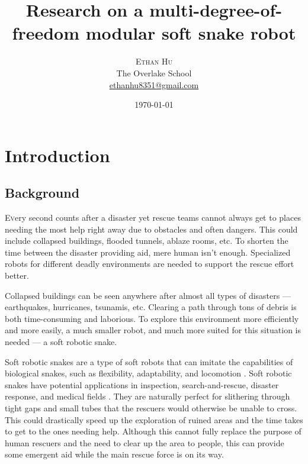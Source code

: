 \documentclass[twoside]{article}
\title{Research on a multi-degree-of-freedom modular soft snake robot} %
\author{%
\textsc{Ethan Hu} \\[1ex] %
\normalsize The Overlake School \\ %
\normalsize \href{mailto:ethanhu8351@gmail.com}{ethanhu8351@gmail.com} %
}
\date{\today} %
\begin{document}
\maketitle


\section{Introduction}
\subsection{Background}
\lettrine[nindent=0em,lines=3]{E} very second counts after a disaster yet rescue teams cannot always get to places needing the most help right away due to obstacles and often dangers. This could include collapsed buildings, flooded tunnels, ablaze rooms, etc. To shorten the time between the disaster providing aid, mere human isn't enough. Specialized robots for different deadly environments are needed to support the rescue effort better. 

Collapsed buildings can be seen anywhere after almost all types of disasters — earthquakes, hurricanes, tsunamis, etc. Clearing a path through tons of debris is both time-consuming and laborious. To explore this environment more efficiently and more easily, a much smaller robot, and much more suited for this situation is needed — a soft robotic snake.

Soft robotic snakes are a type of soft robots that can imitate the capabilities of biological snakes, such as flexibility, adaptability, and locomotion \cite{bsf20}\cite{rt15}. Soft robotic snakes have potential applications in inspection, search-and-rescue, disaster response, and medical fields \cite{lwsstcgyo20}\cite{wsqsglfo}. They are naturally perfect for slithering through tight gaps and small tubes that the rescuers would otherwise be unable to cross. This could drastically speed up the exploration of ruined areas and the time takes to get to the ones needing help. Although this cannot fully replace the purpose of human rescuers and the need to clear up the area to people, this can provide some emergent aid while the main rescue force is on its way. 
\end{document}
